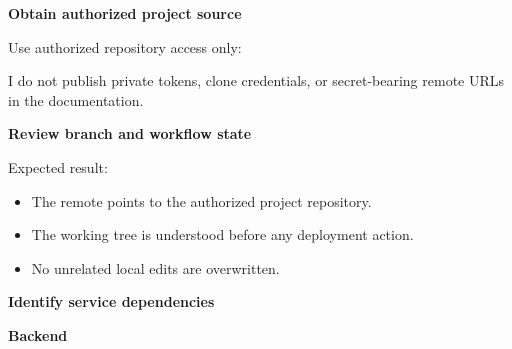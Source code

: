 \vspace{0.5em}\noindent\textbf{Obtain authorized project
source}\par

Use authorized repository access only:

\begin{Shaded}
\begin{Highlighting}[]
 
\end{Highlighting}
\end{Shaded}

I do not publish private tokens, clone credentials, or secret-bearing
remote URLs in the documentation.

\vspace{0.5em}\noindent\textbf{Review branch and workflow
state}\par

\begin{Shaded}
\begin{Highlighting}[]
 
 
\end{Highlighting}
\end{Shaded}

Expected result:

\begin{itemize}
\tightlist
\item
  The remote points to the authorized project repository.
\item
  The working tree is understood before any deployment action.
\item
  No unrelated local edits are overwritten.
\end{itemize}

\vspace{0.5em}\noindent\textbf{Identify service
dependencies}\par

\vspace{0.5em}\noindent\textbf{Backend}\par

\begin{Shaded}
\begin{Highlighting}[]
 
 
 
 
  
\end{Highlighting}
\end{Shaded}

